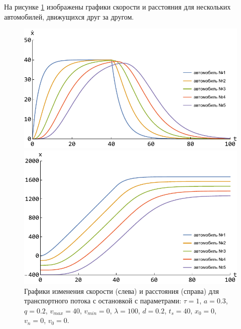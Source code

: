 \documentclass[12pt, a4paper]{extarticle}
\numberwithin{equation}{section}
\numberwithin{figure}{section}
\begin{document}
На рисунке \ref{follow_the_leader} изображены графики скорости и расстояния для нескольких автомобилей, движущихся друг за другом.

\begin{figure}[h!]
	\begin{center}
		\begin{minipage}[h!]{0.48\linewidth}
			\includegraphics[width=1\linewidth,height=0.2\textheight]
			{Images/simple_model_speed.pdf}
		\end{minipage}
		\hfill 
		\begin{minipage}[h!]{0.48\linewidth}
			\includegraphics[width=1\linewidth,height=0.2\textheight]
			{Images/simple_model_distance.pdf}
		\end{minipage}
		\caption{Графики изменения скорости (слева) и расстояния (справа) для транспортного потока с остановкой с параметрами: $\tau=1$, $a=0.3$, $q=0.2$, $v_{max}=40$, $v_{min}=0$, $\lambda=100$, $d=0.2$, $t_s=40$, $x_0=0$, $v_n=0$, $v_0=0$.}
		\label{follow_the_leader}
	\end{center}
\end{figure}
\end{document}
